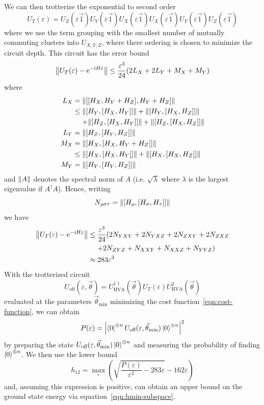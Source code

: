 \documentclass[a4paper,12pt]{article}
\newcommand{\bleq}{\ensuremath{\mathrel{\phantom{=}}}}
\newcommand{\nnl}{\nonumber\\}
\newcommand{\rme}{\mathrm{e}}
\newcommand{\rmi}{\mathrm{i}}
\begin{document}
We can then trotterize the exponential to second order
\begin{equation}
U_T(\varepsilon) = U_Z(\varepsilon \vec{1}) U_Y(\varepsilon \vec{1}) U_X(\varepsilon \vec{1}) U_X(\varepsilon \vec{1})
U_Y(\varepsilon \vec{1}) U_Z(\varepsilon \vec{1})
\end{equation}
where we use the term grouping with the smallest number of mutually commuting clusters into $U_{X,Y,Z}$, where there ordering is chosen to minimize the circuit depth.
This circuit has the error bound~\cite{childsTheoryTrotterError2021}
\begin{equation}
\norm{U_T(\varepsilon) - \rme^{-\rmi H \varepsilon}} 
\leq \frac{\varepsilon^3}{24} (2 L_X + 2 L_Y + M_X + M_Y)
\end{equation}
where
\begin{align}
 L_X &= \norm{\comm{\comm{H_X}{H_Y+H_Z}}{H_Y+H_Z}} \nnl
&\leq \norm{\comm{H_Y}{\comm{H_X}{H_Y}}} +
\norm{\comm{H_Y}{\comm{H_X}{H_Z}}} \nnl &\bleq +
\norm{\comm{H_Z}{\comm{H_X}{H_Y}}} +
\norm{\comm{H_Z}{\comm{H_X}{H_Z}}}  \nnl
 L_Y &= \norm{\comm{H_Z}{\comm{H_Y}{H_Z}}} \nnl
 M_X &= \norm{\comm{H_X}{\comm{H_X}{H_Y+H_Z}}} \nnl
&\leq \norm{\comm{H_X}{\comm{H_X}{H_Y}}} +
\norm{\comm{H_X}{\comm{H_X}{H_Z}}} \nnl
 M_Y &= \norm{\comm{H_Y}{\comm{H_Y}{H_Z}}}
\end{align}
and $\norm{A}$ denotes the spectral norm of $A$ (i.e. $\sqrt{\lambda}$ where $\lambda$ is the largest eigenvalue if $A^\dagger A$). Hence, writing
\begin{equation}
 N_{\rho\sigma\tau} = \norm{\comm{H_\rho}{\comm{H_\sigma}{H_\tau}}}
\end{equation}
we have
\begin{align}\label{eqn:trotter-error-bound}
\norm{U_T(\varepsilon) - \rme^{-\rmi H \varepsilon}} 
&\leq \frac{\varepsilon^3}{24} (2 N_{YXY} + 2 N_{YXZ} + 2 N_{ZXY} + 2 N_{ZXZ} \nnl
&\bleq + 2 N_{ZYZ} + N_{XXY} + N_{XXZ} + N_{YYZ}) \nnl
&\approx 283 \varepsilon^3
\end{align}
With the trotterized circuit
\begin{equation}\label{eqn:uoff-circuit}
 U_\text{off}(\varepsilon,\vec\theta) = U_\text{HVA}^{1\dagger}(\vec\theta) U_T(\varepsilon) U_\text{HVA}^{2}(\vec\theta)
\end{equation}
evaluated at the parameters $\vec\theta_\text{min}$ minimizing the cost function~\eqref{eqn:cost-function}, we can obtain
\begin{equation}
P(\varepsilon) = \abs{\left\langle{0}\right\vert^{\otimes n} U_\text{off}(\varepsilon,\vec\theta_\text{min}) \left\vert{0}\right\rangle^{\otimes n}}^2
\end{equation}
by preparing the state $U_\text{off}(\varepsilon,\vec\theta_\text{min}) \left\vert{0}\right\rangle^{\otimes n}$ and measuring the probability of finding $\left\vert{0}\right\rangle^{\otimes n}$. We then use the lower bound
\begin{equation}\label{eqn:off-diags}
 h_{12} = \max_\varepsilon\left(\sqrt{\frac{P(\varepsilon)}{\varepsilon^2} - 283 \varepsilon} - 162 \varepsilon\right)
\end{equation}
and, assuming this expression is positive, can obtain an upper bound on the ground state energy via equation~\eqref{eqn:hmin-subspace}.
\end{document}
